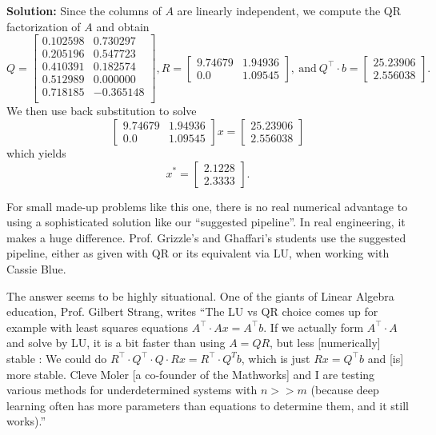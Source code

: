 \textbf{Solution:} Since the columns of $A$ are linearly independent, we compute the QR factorization of $A$ and obtain
$$ Q= \left[\begin{array}{lr}
0.102598  &  0.730297 \\
 0.205196 &   0.547723 \\
 0.410391  &  0.182574 \\
 0.512989  & 0.000000 \\
 0.718185  & -0.365148 \\
 \end{array}\right], R =  \left[\begin{array}{lr}
    9.74679  &      1.94936\\
 0.0  &  1.09545
 \end{array}\right], ~\text{and}~ Q^\top\cdot b =   \left[\begin{array}{l} 25.23906 \\ 2.556038\end{array}\right].
 $$ 
 We then use back substitution to solve
 $$\left[\begin{array}{lr}
    9.74679  &      1.94936\\
 0.0  &  1.09545
 \end{array}\right] x = \left[\begin{array}{l} 25.23906 \\ 2.556038\end{array}\right]$$
which yields
$$x^*= \left[\begin{array}{l}2.1228\\2.3333\end{array}\right]. $$ 
\Qed

For small made-up problems like this one, there is no real numerical advantage to using a sophisticated solution like our ``suggested pipeline''. In real engineering, it makes a huge difference. Prof. Grizzle's and Ghaffari's students use the suggested pipeline, either as given with QR or its equivalent via LU, when working with Cassie Blue.\\

\begin{tcolorbox}[sharp corners, colback=green!30, colframe=green!80!blue, title = \textbf{\Large LU vs QR: Which is Better?} ]
The answer seems to be highly situational. One of the giants of Linear Algebra education, Prof. Gilbert Strang, writes ``The LU vs QR choice comes up for example with least squares equations  $A^\top \cdot A x = A^\top b$.  If we actually form $A^\top \cdot A$ and solve by LU, it is a bit faster than using $A = QR$, but less [numerically] stable :  We could do $R^\top \cdot Q^\top \cdot  Q \cdot R x = R^\top \cdot Q^T b$, which is just $R x = Q^\top b$ and [is] more stable. Cleve Moler [a co-founder of the Mathworks] and I are testing various methods for underdetermined systems with $n >> m$
(because deep learning often has more parameters than equations to determine them, and it still works).''
\end{tcolorbox}


